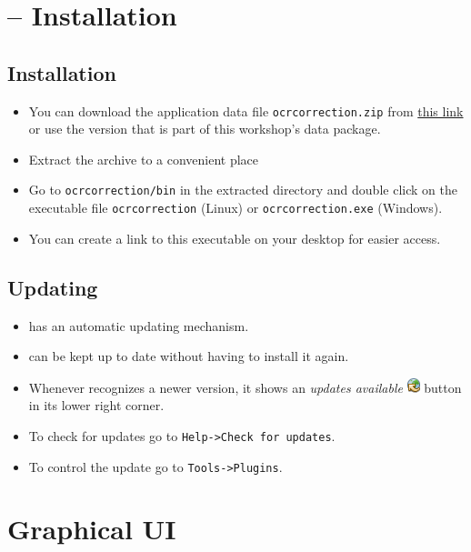 \section{\pocoto{} -- Installation}
\subsection{Installation}
\begin{frame}
	\begin{itemize}
		\item You can download the application data file \texttt{ocrcorrection.zip}
			from \href{http://www.cis.lmu.de/ocrworkshop/pocoto/}{this link} or use
			the version that is part of this workshop's data package.
		\item Extract the archive to a convenient place
		\item Go to \texttt{ocrcorrection/bin} in the extracted directory and double click
			on the executable file \texttt{ocrcorrection} (Linux) or
			\texttt{ocrcorrection.exe} (Windows).
		\item You can create a link to this executable on your desktop for
			easier access.
	\end{itemize}
\end{frame}

\subsection{Updating}
\begin{frame}
	\begin{itemize}
		\item \pocoto{} has an automatic updating mechanism.
		\item \pocoto{} can be kept up to date without having to install it again.
		\item Whenever \pocoto recognizes a newer version, it shows an \emph{updates
			available} \includegraphics{../presentations/images/update-baloon.png}
			button in its lower right corner.
		\item To check for updates go to \texttt{Help->Check for updates}.
		\item To control the update go to \texttt{Tools->Plugins}.
	\end{itemize}
\end{frame}

\section{Graphical UI}
